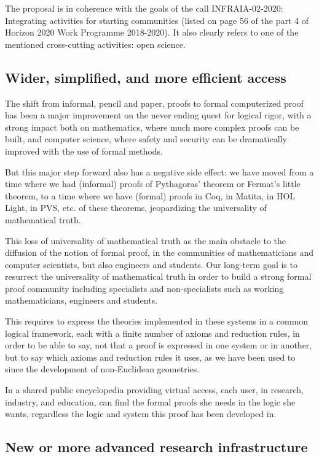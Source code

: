 The proposal is in coherence with the goals of the call INFRAIA-02-2020:
Integrating activities for starting communities (listed on page 56 of
the part 4 of Horizon 2020 Work Programme 2018-2020). It also clearly
refers to one of the mentioned cross-cutting activities: open science.

\subsection{Wider, simplified, and more efficient access}

The shift from informal, pencil and paper, proofs to formal
computerized proof has been a major improvement on the never ending
quest for logical rigor, with a strong impact both on mathematics,
where much more complex proofs can be built, and computer science,
where safety and security can be dramatically improved with the use of
formal methods.

But this major step forward also has a negative side effect: we have
moved from a time where we had (informal) proofs of Pythagoras'
theorem or Fermat's little theorem, to a time where we have (formal)
proofs in {\sc Coq}, in {\sc Matita}, in {\sc HOL Light}, in {\sc
PVS}, etc.  of these theorems, jeopardizing the universality of
mathematical truth.

This loss of universality of mathematical truth as the main obstacle
to the diffusion of the notion of formal proof, in the communities of
mathematicians and computer scientists, but also engineers and
students. Our long-term goal is to resurrect the universality of
mathematical truth in order to build a strong formal proof community
including specialists and non-specialists such as working
mathematicians, engineers and students.

This requires to express the theories implemented in these systems in
a common logical framework, each with a finite number of axioms and
reduction rules, in order to be able to say, not that a proof is
expressed in one system or in another, but to say which axioms and
reduction rules it uses, as we have been used to since the development
of non-Euclidean geometries.

In a shared public encyclopedia providing virtual access, each user,
in research, industry, and education, can find the formal proofs she
needs in the logic she wants, regardless the logic and system this
proof has been developed in.

\subsection{New or more advanced research infrastructure}


